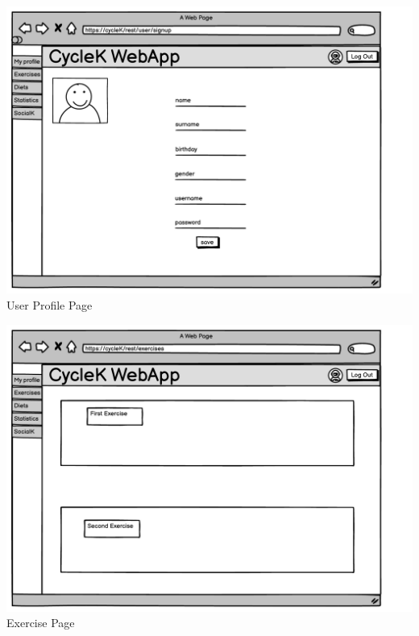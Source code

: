 \begin{center}
\includegraphics[scale=0.47]{Resources/Mockup/UserPage.pdf}\\
User Profile Page
\end{center}

\begin{center}
\includegraphics[scale=0.47]{Resources/Mockup/Exercises.pdf}\\
Exercise Page
\end{center}

